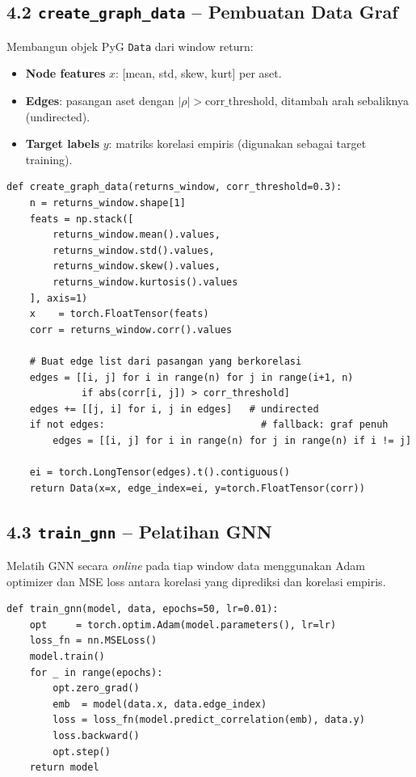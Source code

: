 \documentclass[12pt,a4paper]{article}
\begin{document}
\subsection{4.2 \texttt{create\_graph\_data} -- Pembuatan Data Graf}
Membangun objek PyG \texttt{Data} dari window return:
\begin{itemize}
    \item \textbf{Node features} $x$: [mean, std, skew, kurt] per aset.
    \item \textbf{Edges}: pasangan aset dengan $|\rho| > \text{corr\_threshold}$, ditambah arah sebaliknya (undirected).
    \item \textbf{Target labels} $y$: matriks korelasi empiris (digunakan sebagai target training).
\end{itemize}

\begin{lstlisting}[caption={\texttt{create\_graph\_data}}]
def create_graph_data(returns_window, corr_threshold=0.3):
    n = returns_window.shape[1]
    feats = np.stack([
        returns_window.mean().values,
        returns_window.std().values,
        returns_window.skew().values,
        returns_window.kurtosis().values
    ], axis=1)
    x    = torch.FloatTensor(feats)
    corr = returns_window.corr().values

    # Buat edge list dari pasangan yang berkorelasi
    edges = [[i, j] for i in range(n) for j in range(i+1, n)
             if abs(corr[i, j]) > corr_threshold]
    edges += [[j, i] for i, j in edges]   # undirected
    if not edges:                           # fallback: graf penuh
        edges = [[i, j] for i in range(n) for j in range(n) if i != j]

    ei = torch.LongTensor(edges).t().contiguous()
    return Data(x=x, edge_index=ei, y=torch.FloatTensor(corr))
\end{lstlisting}

\subsection{4.3 \texttt{train\_gnn} -- Pelatihan GNN}
Melatih GNN secara \textit{online} pada tiap window data menggunakan Adam optimizer
dan MSE loss antara korelasi yang diprediksi dan korelasi empiris.

\begin{lstlisting}[caption={\texttt{train\_gnn}}]
def train_gnn(model, data, epochs=50, lr=0.01):
    opt     = torch.optim.Adam(model.parameters(), lr=lr)
    loss_fn = nn.MSELoss()
    model.train()
    for _ in range(epochs):
        opt.zero_grad()
        emb  = model(data.x, data.edge_index)
        loss = loss_fn(model.predict_correlation(emb), data.y)
        loss.backward()
        opt.step()
    return model
\end{lstlisting}
\end{document}
